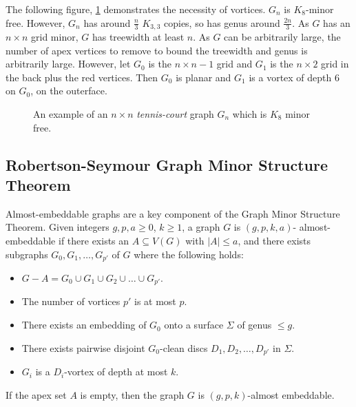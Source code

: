 The following figure, \cref{fig:tenniscourt} demonstrates the necessity of vortices. $G_n$ is $K_8$-minor free. However, $G_n$ has around $\frac{n}{3}$ $K_{3,3}$ copies, so has genus around $\frac{2n}{3}$. As $G$ has an $n \times n$ grid minor, $G$ has treewidth at least $n$. As $G$ can be arbitrarily large, the number of apex vertices to remove to bound the treewidth and genus is arbitrarily large. However, let $G_0$ is the $n \times n - 1$ grid and $G_1$ is the $n \times 2$ grid in the back plus the red vertices. Then $G_0$ is planar and $G_1$ is a vortex of depth 6 on $G_0$, on the outerface. 

\begin{figure}[h]
	\centering
	
	\caption[Tennis-Court graph]{An example of an $n \times n$ \textit{tennis-court} graph $G_n$ which is \(K_8\) minor free.}\label{fig:tenniscourt}
\end{figure}
\subsection{Robertson-Seymour Graph Minor Structure Theorem}\label{ssec:Robertson_Seymour_Graph_Structure}
Almost-embeddable graphs are a key component of the Graph Minor Structure Theorem. Given integers \(g, p, a \geq 0\), \(k \geq 1\), a graph \(G\) is \((g, p, k, a)\)- almost-embeddable if there exists an \(A \subseteq V(G)\) with \(|A| \leq a\), and there exists subgraphs \(G_0, G_1, \ldots,  G_{p'}\) of \(G\) where the following holds:
\begin{itemize}
	\item \(G - A = G_0 \cup G_1 \cup G_2 \cup \ldots \cup G_{p'}\).
	\item The number of vortices $p'$ is at most $p$.
	\item There exists an embedding of \(G_0\) onto a surface \(\Sigma\) of genus \(\leq g\).
	\item There exists pairwise disjoint \(G_0\)-clean discs \(D_1, D_2, \ldots, D_{p'}\) in \(\Sigma\).
	\item \(G_i\) is a \(D_i\)-vortex of depth at most \(k\).
\end{itemize}

 If the apex set $A$ is empty, then the graph $G$ is $(g, p, k)$-almost embeddable. 

